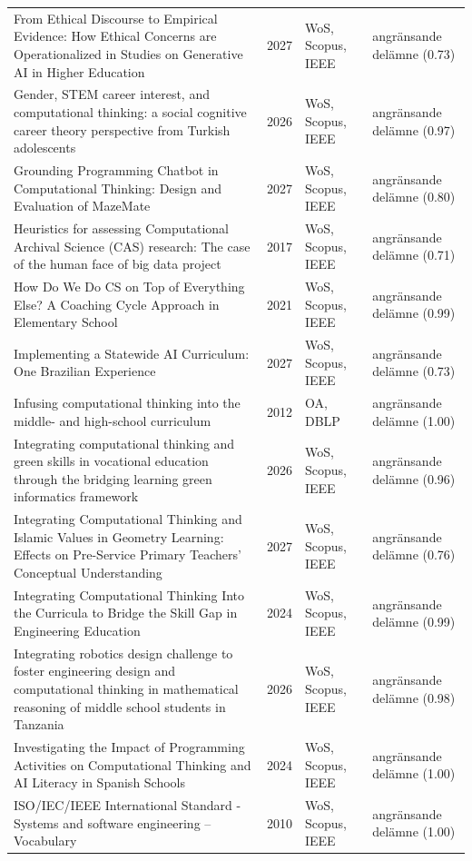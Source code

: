 \begin{longtable}{@{}%
  >{\raggedright\arraybackslash}p{}c%
  >{\raggedright\arraybackslash}p{}%
  >{\raggedright\arraybackslash}p{}@{}}
From Ethical Discourse to Empirical Evidence: How Ethical Concerns are Operationalized in Studies on Generative AI in Higher Education & 2027 & WoS, Scopus, IEEE & angränsande delämne (0.73) \\
Gender, STEM career interest, and computational thinking: a social cognitive career theory perspective from Turkish adolescents & 2026 & WoS, Scopus, IEEE & angränsande delämne (0.97) \\
Grounding Programming Chatbot in Computational Thinking: Design and Evaluation of MazeMate & 2027 & WoS, Scopus, IEEE & angränsande delämne (0.80) \\
Heuristics for assessing Computational Archival Science (CAS) research: The case of the human face of big data project & 2017 & WoS, Scopus, IEEE & angränsande delämne (0.71) \\
How Do We Do CS on Top of Everything Else? A Coaching Cycle Approach in Elementary School & 2021 & WoS, Scopus, IEEE & angränsande delämne (0.99) \\
Implementing a Statewide AI Curriculum: One Brazilian Experience & 2027 & WoS, Scopus, IEEE & angränsande delämne (0.73) \\
Infusing computational thinking into the middle- and high-school curriculum & 2012 & OA, DBLP & angränsande delämne (1.00) \\
Integrating computational thinking and green skills in vocational education through the bridging learning green informatics framework & 2026 & WoS, Scopus, IEEE & angränsande delämne (0.96) \\
Integrating Computational Thinking and Islamic Values in Geometry Learning: Effects on Pre-Service Primary Teachers' Conceptual Understanding & 2027 & WoS, Scopus, IEEE & angränsande delämne (0.76) \\
Integrating Computational Thinking Into the Curricula to Bridge the Skill Gap in Engineering Education & 2024 & WoS, Scopus, IEEE & angränsande delämne (0.99) \\
Integrating robotics design challenge to foster engineering design and computational thinking in mathematical reasoning of middle school students in Tanzania & 2026 & WoS, Scopus, IEEE & angränsande delämne (0.98) \\
Investigating the Impact of Programming Activities on Computational Thinking and AI Literacy in Spanish Schools & 2024 & WoS, Scopus, IEEE & angränsande delämne (1.00) \\
ISO/IEC/IEEE International Standard - Systems and software engineering -- Vocabulary & 2010 & WoS, Scopus, IEEE & angränsande delämne (1.00) \\

\end{longtable}

